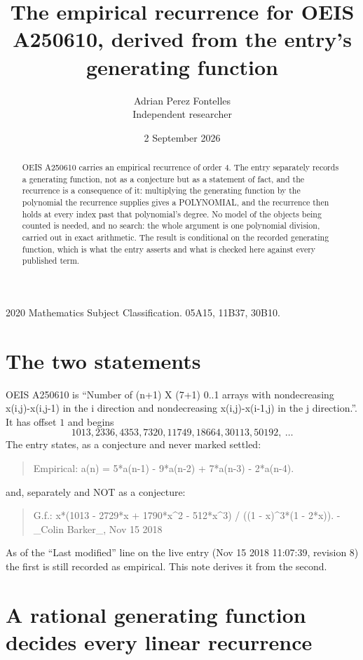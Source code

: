 \documentclass[11pt,a4paper]{article}
\title{The empirical recurrence for OEIS A250610, derived from the entry's generating function}
\author{Adrian Perez Fontelles\\ \small Independent researcher}
\date{2 September 2026}
\theoremstyle{plain}
\theoremstyle{definition}
\begin{document}
\maketitle

\begin{abstract}
OEIS A250610 carries an empirical recurrence of order $4$. The entry separately records a
generating function, not as a conjecture but as a statement of fact, and the recurrence is a
consequence of it: multiplying the generating function by the polynomial the recurrence
supplies gives a POLYNOMIAL, and the recurrence then holds at every index past that
polynomial's degree. No model of the objects being counted is needed, and no search: the
whole argument is one polynomial division, carried out in exact arithmetic. The result is
conditional on the recorded generating function, which is what the entry asserts and what is
checked here against every published term.
\end{abstract}

\noindent\small 2020 Mathematics Subject Classification. 05A15, 11B37, 30B10.\normalsize

\section{The two statements}

OEIS A250610 is ``Number of (n+1) X (7+1) 0..1 arrays with nondecreasing x(i,j)-x(i,j-1) in the i direction and nondecreasing x(i,j)-x(i-1,j) in the j direction.''. It has offset $1$ and begins
\[
1013, 2336, 4353, 7320, 11749, 18664, 30113, 50192,\ \dots
\]
The entry states, as a conjecture and never marked settled:
\begin{quote}
Empirical: a(n) = 5*a(n-1) - 9*a(n-2) + 7*a(n-3) - 2*a(n-4).
\end{quote}
and, separately and NOT as a conjecture:
\begin{quote}
G.f.: x*(1013 - 2729*x + 1790*x\^{}2 - 512*x\^{}3) / ((1 - x)\^{}3*(1 - 2*x)). - \_Colin Barker\_, Nov 15 2018
\end{quote}
As of the ``Last modified'' line on the live entry (Nov 15 2018 11:07:39, revision 8) the first is still
recorded as empirical. This note derives it from the second.

\section{A rational generating function decides every linear recurrence}
\end{document}
